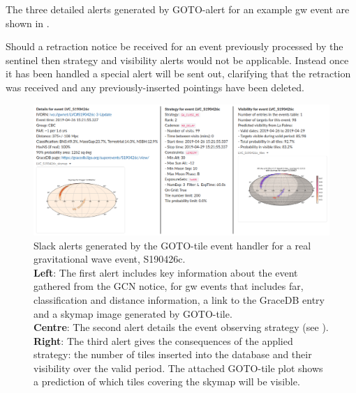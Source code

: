 \begin{colsection}
\begin{colsection}
The three detailed alerts generated by GOTO-alert for an example \gls{gw} event are shown in .

Should a retraction notice be received for an event previously processed by the sentinel then strategy and visibility alerts would not be applicable. Instead once it has been handled a special alert will be sent out, clarifying that the retraction was received and any previously-inserted pointings have been deleted.

\begin{figure}
    \begin{center}
        \includegraphics[width=\linewidth]{images/gototile_slack_side.png}
    \end{center}
    \caption[Slack alerts created by GOTO-tile for a GW event]{
        Slack alerts generated by the GOTO-tile event handler for a real gravitational wave event, S190426c.\\
        \textbf{Left}: The first alert includes key information about the event gathered from the GCN notice, for \gls{gw} events that includes \gls{far}, classification and distance information, a link to the GraceDB entry and a skymap image generated by GOTO-tile.\\
        \textbf{Centre}: The second alert details the event observing strategy (see ).\\
        \textbf{Right}: The third alert gives the consequences of the applied strategy: the number of tiles inserted into the database and their visibility over the valid period. The attached GOTO-tile plot shows a prediction of which tiles covering the skymap will be visible.
    }\label{fig:gototile_slack}
\end{figure}

\end{colsection}


\end{colsection}

